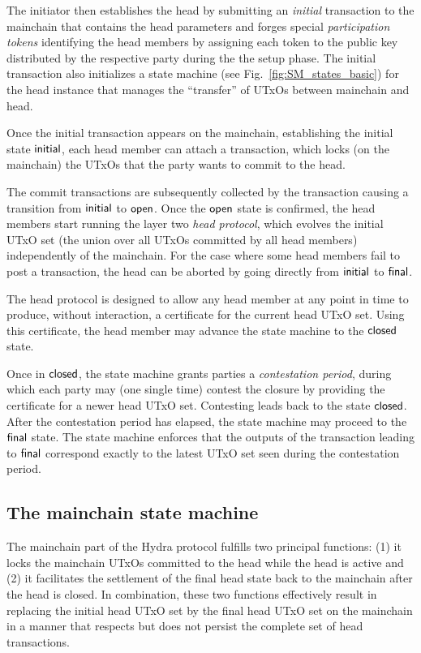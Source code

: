 The initiator then establishes the head by submitting an
\emph{initial} transaction to the mainchain that contains the
head parameters and forges special \emph{participation tokens}
identifying the head members by assigning each token to the public key
distributed by the respective party during the the setup phase.
The initial transaction also initializes a state machine
(see Fig.~\ref{fig:SM_states_basic}) for the head instance that manages
the ``transfer'' of UTxOs between mainchain and head.

Once the initial transaction appears on the mainchain, establishing
the initial state $\mathsf{initial}$, each head member can attach a
\mtxCom{} transaction, which locks (on the mainchain) the UTxOs that
the party wants to commit to the head.

The commit transactions are subsequently collected by the \mtxCCom{} transaction
causing a transition from $\mathsf{initial}$ to $\mathsf{open}$. Once the $\mathsf{open}$ state is
confirmed, the head members start running the layer two \emph{head protocol},
which evolves the initial UTxO set (the union over all UTxOs committed by all
head members) independently of the mainchain. For the case where some head
members fail to post a \mtxCom{} transaction, the head can be aborted by going
directly from $\mathsf{initial}$ to $\mathsf{final}$.

The head protocol is designed to allow any head member
at any point in time to produce, without interaction, a certificate
for the current head UTxO set.  Using this certificate, the head member
may advance the state machine to the $\mathsf{closed}$ state.

Once in $\mathsf{closed}$, the state machine grants parties a
\emph{contestation period}, during which each party may (one single
time) contest the closure by providing the certificate for a newer head
UTxO set.  Contesting leads back to the state $\mathsf{closed}$.
After the contestation period has elapsed, the state machine may proceed
to the $\mathsf{final}$ state.  The state machine enforces that the
outputs of the transaction leading to $\mathsf{final}$ correspond exactly to
the latest UTxO set seen during the contestation period.


\subsection{The mainchain state machine}\label{sec:overview_mc}

The mainchain part of the Hydra protocol fulfills two principal
functions: (1) it locks the mainchain UTxOs committed %
to the head while the head is active and (2) it facilitates the
settlement of the final head state back to the mainchain after the
head is closed. In combination, these two functions effectively result
in replacing the initial head UTxO set by the final head UTxO set on
the mainchain in a manner that respects but does not persist the
complete set of head transactions.

